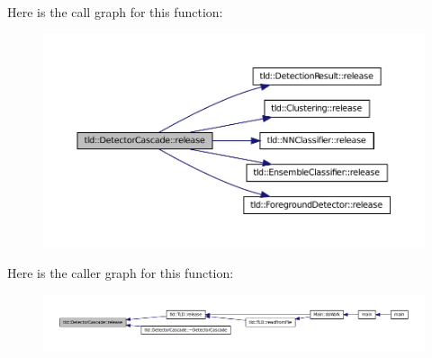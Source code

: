 Here is the call graph for this function:
\nopagebreak
\begin{figure}[H]
\begin{center}
\leavevmode
\includegraphics[width=400pt]{classtld_1_1_detector_cascade_a4658f60cc03595d55920b4949ff26a69_cgraph}
\end{center}
\end{figure}




Here is the caller graph for this function:
\nopagebreak
\begin{figure}[H]
\begin{center}
\leavevmode
\includegraphics[width=400pt]{classtld_1_1_detector_cascade_a4658f60cc03595d55920b4949ff26a69_icgraph}
\end{center}
\end{figure}




